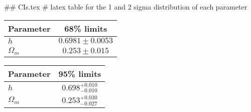## CIs.tex
# latex table for the 1 and 2 sigma distribution of each parameter

\begin{tabular} { l  c}
 Parameter &  68\% limits\\
\hline
{\boldmath$h              $} & $0.6981\pm 0.0053          $\\
{\boldmath$\Omega_m       $} & $0.253\pm 0.015            $\\
\hline
\end{tabular}

\begin{tabular} { l  c}
 Parameter &  95\% limits\\
\hline
{\boldmath$h              $} & $0.698^{+0.010}_{-0.010}   $\\
{\boldmath$\Omega_m       $} & $0.253^{+0.030}_{-0.027}   $\\
\hline
\end{tabular}
